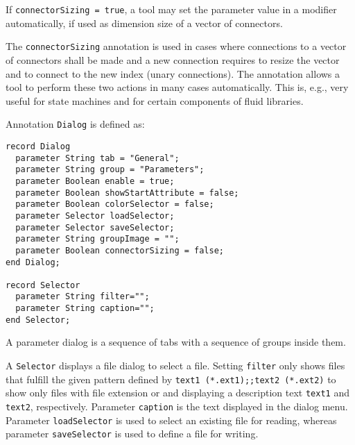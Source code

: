 If \lstinline!connectorSizing = true!, a tool may set the parameter value
in a modifier automatically, if used as dimension size of a vector of
connectors.

\begin{nonnormative}
The \lstinline!connectorSizing! annotation is used in cases
where connections to a vector of connectors shall be made and a new
connection requires to resize the vector and to connect to the new index
(unary connections). The annotation allows a tool to perform these two
actions in many cases automatically. This is, e.g., very useful for
state machines and for certain components of fluid libraries.
\end{nonnormative}

Annotation \lstinline!Dialog! is defined as:
\begin{lstlisting}[language=modelica]
record Dialog
  parameter String tab = "General";
  parameter String group = "Parameters";
  parameter Boolean enable = true;
  parameter Boolean showStartAttribute = false;
  parameter Boolean colorSelector = false;
  parameter Selector loadSelector;
  parameter Selector saveSelector;
  parameter String groupImage = "";
  parameter Boolean connectorSizing = false;
end Dialog;

record Selector
  parameter String filter="";
  parameter String caption="";
end Selector;
\end{lstlisting}
A parameter dialog is a sequence of tabs with a sequence of groups
inside them.

A \lstinline!Selector! displays a file dialog to select a file. Setting \lstinline!filter! only
shows files that fulfill the given pattern defined by \lstinline!text1 (*.ext1);;text2 (*.ext2)! to show only files with file extension
 or  and displaying a description text \lstinline!text1! and
\lstinline!text2!, respectively. Parameter \lstinline!caption! is the text displayed in the
dialog menu. Parameter \lstinline!loadSelector! is used to select an existing file
for reading, whereas parameter \lstinline!saveSelector! is used to define a file for
writing.

